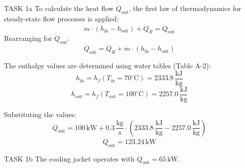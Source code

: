 TASK 1a  
To calculate the heat flow \( \dot{Q}_{\text{out}} \), the first law of thermodynamics for steady-state flow processes is applied:  
\[
\dot{m} \cdot (h_{\text{in}} - h_{\text{out}}) + \dot{Q}_R = \dot{Q}_{\text{out}}
\]  
Rearranging for \( \dot{Q}_{\text{out}} \):  
\[
\dot{Q}_{\text{out}} = \dot{Q}_R + \dot{m} \cdot (h_{\text{in}} - h_{\text{out}})
\]  

The enthalpy values are determined using water tables (Table A-2):  
\[
h_{\text{in}} = h_f(T_{\text{in}} = 70^\circ\text{C}) = 2333.8 \, \frac{\text{kJ}}{\text{kg}}
\]  
\[
h_{\text{out}} = h_f(T_{\text{out}} = 100^\circ\text{C}) = 2257.0 \, \frac{\text{kJ}}{\text{kg}}
\]  

Substituting the values:  
\[
\dot{Q}_{\text{out}} = 100 \, \text{kW} + 0.3 \, \frac{\text{kg}}{\text{s}} \cdot \left( 2333.8 \, \frac{\text{kJ}}{\text{kg}} - 2257.0 \, \frac{\text{kJ}}{\text{kg}} \right)
\]  
\[
\dot{Q}_{\text{out}} = 123.24 \, \text{kW}
\]  

TASK 1b  
The cooling jacket operates with \( \dot{Q}_{\text{out}} = 65 \, \text{kW} \).